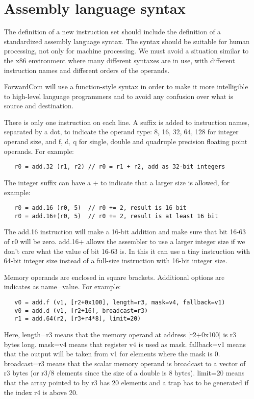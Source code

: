 \documentclass[forwardcom.tex]{subfiles}
\begin{document}
\RaggedRight


\section{Assembly language syntax} \label{assemblySyntax}
The definition of a new instruction set should include the definition of a standardized assembly language syntax. The syntax should be suitable for human processing, not only for machine processing. We must avoid a situation similar to the x86 environment where many different syntaxes are in use, with different instruction names and different orders of the operands. 
\vspace{2mm}

ForwardCom will use a function-style syntax in order to make it more intelligible to high-level language programmers and to avoid any confusion over what is source and destination. 

\vspace{2mm}
There is only one instruction on each line. A suffix is added to instruction names, separated by a dot, to indicate the operand type: 8, 16, 32, 64, 128 for integer operand size, and f, d, q for single, double and quadruple precision floating point operands. For example:
\begin{lstlisting}
   r0 = add.32 (r1, r2) // r0 = r1 + r2, add as 32-bit integers
\end{lstlisting}

The integer suffix can have a + to indicate that a larger size is allowed, for example:
\begin{lstlisting}
   r0 = add.16 (r0, 5)  // r0 += 2, result is 16 bit
   r0 = add.16+(r0, 5)  // r0 += 2, result is at least 16 bit
\end{lstlisting}

The add.16 instruction will make a 16-bit addition and make sure that bit 16-63 of r0 will be zero. add.16+ allows the assembler to use a larger integer size if we don't care what the value of bit 16-63 is. In this it can use a tiny instruction with 64-bit integer size instead of a full-size instruction with 16-bit integer size.

\vspace{2mm}
Memory operands are enclosed in square brackets. Additional options are indicates as name=value. For example:

\begin{lstlisting}
   v0 = add.f (v1, [r2+0x100], length=r3, mask=v4, fallback=v1)
   v0 = add.d (v1, [r2+16], broadcast=r3)
   r1 = add.64(r2, [r3+r4*8], limit=20)
\end{lstlisting}
Here, length=r3 means that the memory operand at address [r2+0x100] is r3 bytes long. mask=v4 means that register v4 is used as mask. fallback=v1 means that the output will be taken from v1 for elements where the mask is 0. broadcast=r3 means that the scalar memory operand is broadcast to a vector of r3 bytes (or r3/8 elements since the size of a double is 8 bytes). limit=20 means that the array pointed to by r3 has 20 elements and a trap has to be generated if the index r4 is above 20.
\end{document}
